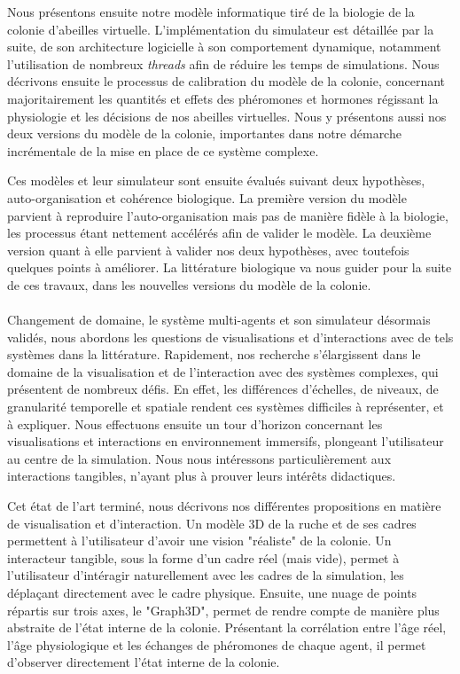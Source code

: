 Nous présentons ensuite notre modèle informatique tiré de la biologie de la colonie d'abeilles virtuelle. L'implémentation du simulateur est détaillée par la suite, de son architecture logicielle à son comportement dynamique, notamment l'utilisation de nombreux \textit{threads} afin de réduire les temps de simulations. Nous décrivons ensuite le processus de calibration du modèle de la colonie, concernant majoritairement les quantités et effets des phéromones et hormones régissant la physiologie et les décisions de nos abeilles virtuelles. Nous y présentons aussi nos deux versions du modèle de la colonie, importantes dans notre démarche incrémentale de la mise en place de ce système complexe.

Ces modèles et leur simulateur sont ensuite évalués suivant deux hypothèses, auto-organisation et cohérence biologique. La première version du modèle parvient à reproduire l'auto-organisation mais pas de manière fidèle à la biologie, les processus étant nettement accélérés afin de valider le modèle. La deuxième version quant à elle parvient à valider nos deux hypothèses, avec toutefois quelques points à améliorer. La littérature biologique va nous guider pour la suite de ces travaux, dans les nouvelles versions du modèle de la colonie.

\paragraph{}

Changement de domaine, le système multi-agents et son simulateur désormais validés, nous abordons les questions de visualisations et d'interactions avec de tels systèmes dans la littérature. Rapidement, nos recherche s'élargissent dans le domaine de la visualisation et de l'interaction avec des systèmes complexes, qui présentent de nombreux défis. En effet, les différences d'échelles, de niveaux, de granularité temporelle et spatiale rendent ces systèmes difficiles à représenter, et à expliquer. Nous effectuons ensuite un tour d'horizon concernant les visualisations et interactions en environnement immersifs, plongeant l'utilisateur au centre de la simulation. Nous nous intéressons particulièrement aux interactions tangibles, n'ayant plus à prouver leurs intérêts didactiques.

Cet état de l'art terminé, nous décrivons nos différentes propositions en matière de visualisation et d'interaction. Un modèle 3D de la ruche et de ses cadres permettent à l'utilisateur d'avoir une vision "réaliste" de la colonie. Un interacteur tangible, sous la forme d'un cadre réel (mais vide), permet à l'utilisateur d'intéragir naturellement avec les cadres de la simulation, les déplaçant directement avec le cadre physique. Ensuite, une nuage de points répartis sur trois axes, le "Graph3D", permet de rendre compte de manière plus abstraite de l'état interne de la colonie. Présentant la corrélation entre l'âge réel, l'âge physiologique et les échanges de phéromones de chaque agent, il permet d'observer directement l'état interne de la colonie.

